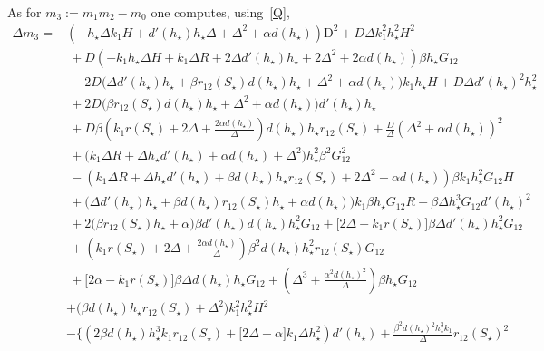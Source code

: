 \documentclass[reqno,11pt]{amsart}
\numberwithin{equation}{section}
\begin{document}
\begin{appendix}
 
 As for $m_3:=m_1m_2-m_0$ one computes, using~\eqref{Q},
\begin{align*}
\Delta m_3=&
\left(- h_\star\Delta   k_1 H +d'(h_\star)  h_\star\Delta +\Delta^{2} +  \alpha  d(h_\star)\right) \mathrm{D}^{2} +D\Delta   k_1^{2} h_\star^{2} H^{2}\\
&\ +D\left(- k_1  h_\star \Delta   H + k_1  \Delta   R +2 \Delta   d'(h_\star)  h_\star  +2\Delta^{2}+  2\alpha  d(h_\star)\right) \beta   h_\star G_{12}\\
&\ -2D\Big(    \Delta  d'(h_\star)h_\star + \beta  r_{12}(S_\star) d(h_\star) h_\star+\Delta^{2}+  \alpha  d(h_\star)  \Big) k_1  h_\star H +D\Delta  d'(h_\star)^{2} h_\star^{2}\\
& \ +2D\Big( \beta r_{12}(S_\star)  d(h_\star) h_\star +\Delta^2+\alpha d(h_\star)\Big)  d'(h_\star)h_\star\\ 
& \ + D\beta \left( k_1  r(S_\star) +2\Delta+\frac{2\alpha d(h_\star)}{\Delta}\right)  d(h_\star) h_\star r_{12}(S_\star)+\frac{D}{\Delta}\left(\Delta^{2}+  \alpha  d(h_\star)\right)^2 \\
&\ +\Big( k_1   \Delta    R +\Delta  h_\star d'(h_\star) +\alpha  d(h_\star)+\Delta^2 \Big) h_\star^{2}\beta^{2} G_{12}^{2}\\
&\ -\left(k_1  \Delta  R +   \Delta  h_\star d'(h_\star) +\beta d(h_\star) h_\star  r_{12}(S_\star) +2\Delta^{2} +\alpha  d(h_\star)\right)\beta k_1 h_\star^{2} G_{12}   H\\
&\  +\Big(\Delta  d'(h_\star)h_\star + \beta d(h_\star)r_{12}(S_\star)h_\star+\alpha  d(h_\star)\Big) k_1 \beta h_\star    G_{12} R
+\beta\Delta  h_\star^{3}  G_{12} d'(h_\star)^{2}\\
&\ + 2\Big( \beta r_{12}(S_\star) h_\star +\alpha  \Big)\beta d'(h_\star)d(h_\star) h_\star^{2}G_{12} + \big[2\Delta-k_1 r(S_\star)\big]  \beta \Delta d'(h_\star) h_\star^{2}G_{12}\\
&\ +\left( k_1  r(S_\star) +2\Delta+\frac{2\alpha d(h_\star)}{\Delta}\right) \beta^2 d(h_\star) h_\star^{2} r_{12}(S_\star)G_{12}\\
&\ + \big[2\alpha-k_1 r(S_\star)\big] \beta \Delta d(h_\star) h_\star G_{12}+\left(\Delta^{3}+\frac{\alpha^2 d(h_\star)^2}{\Delta}\right)\beta h_\star G_{12}\\
& +\Big(\beta  d(h_\star) h_\star  r_{12}(S_\star) +  \Delta^{2}\Big)k_1^{2} h_\star^{2} H^{2}\\
&-\Bigg\{\left(2 \beta  d(h_\star) h_\star^{3}  k_1 r_{12}(S_\star) +\big[2\Delta-\alpha\big] k_1 \Delta h_\star^2    \right) d'(h_\star) +\frac{\beta^{2} d(h_\star)^{2} h_\star^{3}  k_1 }{\Delta} r_{12}(S_\star)^{2}\\

\end{align*}
\end{appendix}
\end{document}
